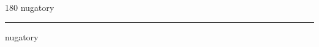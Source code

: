 
\begin{frame}
\begin{center}
\begin{turn}{180}
{\fontsize{2.5cm}{1em}\selectfont nugatory}
\end{turn}
\vspace{1em}\par  
\hrule
\vspace{1em}\par  
{\fontsize{2.5cm}{1em}\selectfont nugatory}
\end{center}
\end{frame}
